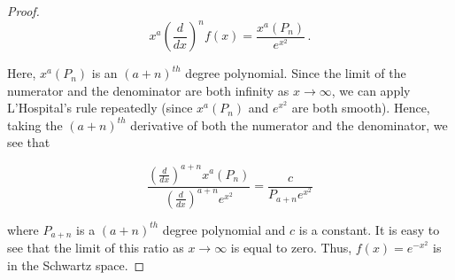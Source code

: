 \documentclass[a4paper]{article}
\numberwithin{equation}{section}
\begin{document}
\begin{description}
\begin{proof}
$$x^a(\frac{d}{dx})^n f(x) = \frac{x^a(P_n)}{e^{x^2}}\,.$$

Here, $x^a(P_n)$ is an $(a+n)^{th}$ degree polynomial. Since the limit of the numerator and the denominator are both infinity as $x \rightarrow \infty$, we can apply L'Hospital’s rule repeatedly (since $x^a(P_n)$ and $e^{x^2}$ are both smooth). Hence, taking the $(a+n)^{th}$ derivative of both the numerator and the denominator, we see that

$$\frac{(\frac{d}{dx})^{a+n}x^a(P_n)}{(\frac{d}{dx})^{a+n}e^{x^2}} = \frac{c}{P_{a+n}e^{x^2}}$$

where $P_{a+n}$ is a $(a+n)^{th}$ degree polynomial and $c$ is a constant. It is easy to see that the limit of this ratio as $x \rightarrow \infty$ is equal to zero. Thus, $f(x) = e^{-x^2}$ is in the Schwartz space.

\end{proof}



\end{description}
\end{document}
